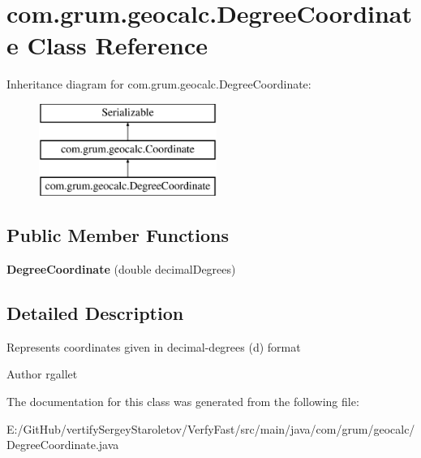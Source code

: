 \hypertarget{classcom_1_1grum_1_1geocalc_1_1_degree_coordinate}{}\section{com.\+grum.\+geocalc.\+Degree\+Coordinate Class Reference}
\label{classcom_1_1grum_1_1geocalc_1_1_degree_coordinate}
Inheritance diagram for com.\+grum.\+geocalc.\+Degree\+Coordinate\+:\begin{figure}[H]
\begin{center}
\leavevmode
\includegraphics[height=3.000000cm]{classcom_1_1grum_1_1geocalc_1_1_degree_coordinate}
\end{center}
\end{figure}
\subsection*{Public Member Functions}
\begin{DoxyCompactItemize}
\item 
\mbox{\label{classcom_1_1grum_1_1geocalc_1_1_degree_coordinate_ae82619e2e038dc2ae175abae50b07bbf}} 
{\bfseries Degree\+Coordinate} (double decimal\+Degrees)
\end{DoxyCompactItemize}


\subsection{Detailed Description}
Represents coordinates given in decimal-\/degrees (d) format

\begin{DoxyAuthor}{Author}
rgallet 
\end{DoxyAuthor}


The documentation for this class was generated from the following file\+:\begin{DoxyCompactItemize}
\item 
E\+:/\+Git\+Hub/vertify\+Sergey\+Staroletov/\+Verfy\+Fast/src/main/java/com/grum/geocalc/Degree\+Coordinate.\+java\end{DoxyCompactItemize}
